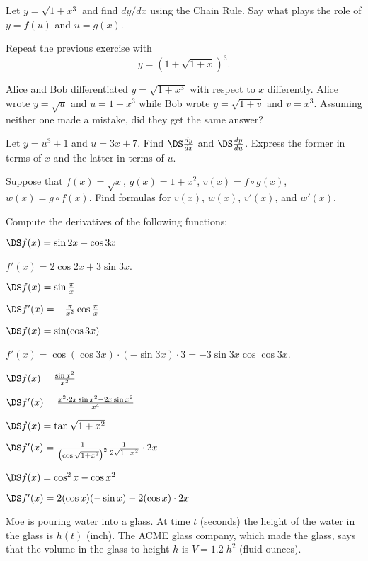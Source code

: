 \begin{multicols}{2}\setlength{\parindent}{0pt}
\problem  Let $y=\sqrt{1+x^3}$ and find $dy/dx$ using the
Chain Rule.  Say what plays the role of $y=f(u)$ and $u=g(x)$.


\problem  Repeat the previous exercise with
\[
y=(1+\sqrt{1+x})^3.
\]


\problem  Alice and Bob differentiated $y=\sqrt{1+x^3}$ with
respect to $x$ differently.  Alice wrote $y=\sqrt{u}$ and $u=1+x^3$
while Bob wrote $y=\sqrt{1+v}$ and $v=x^3$.  Assuming neither one
made a mistake, did they get the same answer?


\problem  Let $y=u^3+1$ and $u=3x+7$.  Find $\DS
\frac{dy}{dx}$ and $\DS \frac{dy}{du}$.  Express the former in
terms of $x$ and the latter in terms of $u$.


\problem  Suppose that $f(x)=\sqrt{x}$, $g(x)=1+x^2$,
$v(x)=f\circ g(x)$, $w(x)=g\circ f(x)$. Find formulas for
$v(x)$, $w(x)$, $v'(x)$, and $w'(x)$.


\medskip




\problem Compute the derivatives of the following functions:

\subprob $\DS f(x)   = \sin 2x-\cos 3x $

\answer
$f'(x) = 2\cos 2x+3\sin 3x$.
\endanswer

\subprob $\DS f(x)   = \sin\frac\pi x $

\answer
$\DS f'(x) = -\frac\pi{x^2}\cos\frac\pi x$
\endanswer

\subprob $\DS f(x)   = \sin (\cos 3x) $

\answer
$f'(x) = \cos(\cos 3x)\cdot (-\sin 3x)\cdot 3 = -3\sin 3x \cos\cos
3x$.
\endanswer

\subprob $\DS f(x)   = \frac{\sin x^2}{x^2} $

\answer
$\DS f'(x) = \frac{x^2\cdot 2x\sin x^2 - 2x\sin x^2}{x^4}$
\endanswer

\subprob $\DS f(x)   = \tan\sqrt{1+x^2}$

\answer
$\DS f'(x) = \frac1{\bigl(\cos \sqrt{1+x^2}\bigr)^2}
\frac1{2\sqrt{1+x^2}}\cdot 2x$
\endanswer

\subprob $\DS f(x)   = \cos^2x - \cos x^2$

\answer
$\DS f'(x) = 2(\cos x)(-\sin x)-2(\cos x) \cdot 2x$
\endanswer


\medskip

\problem \groupproblem Moe is pouring water into a glass.
At time $t$ (seconds) the height of
the water in the glass is $h(t)$ (inch).  The \textsc{ACME} glass
company, which made the glass, says that the volume in the glass to
height $h$ is $V = 1.2\;h^2$ (fluid ounces).


\end{multicols}
